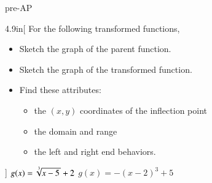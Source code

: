 \begin{taggedblock}{pre-AP}
    \begin{my2Problems}{4.9in}[
        For the following transformed functions,
        \vspace{-0.75\baselineskip}
        \small
        \begin{itemize}[nosep]
            \item Sketch the graph of the parent function.
            \item Sketch the graph of the transformed function.
            \item Find these attributes:
            \begin{itemize}[nosep]
            \item the $(x,y)$ coordinates of the inflection point
            \item the domain and range
            \item the left and right end behaviors.
            \end{itemize}
        \end{itemize}
        ]
        {
            $g(x) = \myRoot[3]{x-5} +2$
        }
        {
            $g(x) = -(x-2)^3 + 5$
        }
    \end{my2Problems}
\end{taggedblock}



